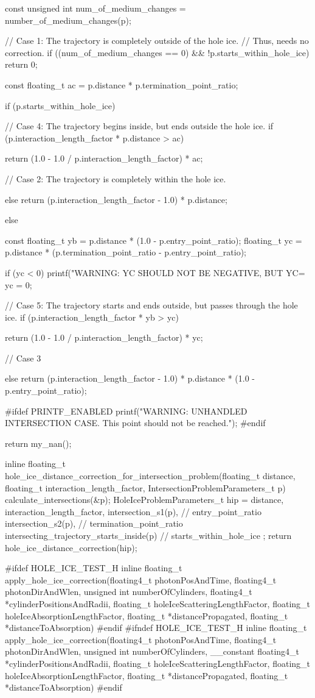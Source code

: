 \begin{ccode}
{  const unsigned int num_of_medium_changes = number_of_medium_changes(p);

  // Case 1: The trajectory is completely outside of the hole ice.
  // Thus, needs no correction.
  if ((num_of_medium_changes == 0) && !p.starts_within_hole_ice) {
    return 0;
  }

  const floating_t ac = p.distance * p.termination_point_ratio;

  if (p.starts_within_hole_ice) {

    // Case 4: The trajectory begins inside, but ends outside the hole ice.
    if (p.interaction_length_factor * p.distance > ac) {
      return (1.0 - 1.0 / p.interaction_length_factor) * ac;

    // Case 2: The trajectory is completely within the hole ice.
    } else {
      return (p.interaction_length_factor - 1.0) * p.distance;
    }

  } else {

    const floating_t yb = p.distance * (1.0 - p.entry_point_ratio);
    floating_t yc = p.distance * (p.termination_point_ratio - p.entry_point_ratio);

    if (yc < 0) {
      printf("WARNING: YC SHOULD NOT BE NEGATIVE, BUT YC=%
      yc = 0;
    }

    // Case 5: The trajectory starts and ends outside, but passes through the hole ice.
    if (p.interaction_length_factor * yb > yc) {
      return (1.0 - 1.0 / p.interaction_length_factor) * yc;

    // Case 3
    } else {
      return (p.interaction_length_factor - 1.0) * p.distance * (1.0 - p.entry_point_ratio);
    }
  }

#ifdef PRINTF_ENABLED
  printf("WARNING: UNHANDLED INTERSECTION CASE. This point should not be reached.");
#endif

  return my_nan();
}

inline floating_t hole_ice_distance_correction_for_intersection_problem(floating_t distance, floating_t interaction_length_factor, IntersectionProblemParameters_t p)
{
  calculate_intersections(&p);
  HoleIceProblemParameters_t hip = {
    distance,
    interaction_length_factor,
    intersection_s1(p), // entry_point_ratio
    intersection_s2(p), // termination_point_ratio
    intersecting_trajectory_starts_inside(p) // starts_within_hole_ice
  };
  return hole_ice_distance_correction(hip);
}

#ifdef HOLE_ICE_TEST_H
inline floating_t apply_hole_ice_correction(floating4_t photonPosAndTime, floating4_t photonDirAndWlen, unsigned int numberOfCylinders, floating4_t *cylinderPositionsAndRadii, floating_t holeIceScatteringLengthFactor, floating_t holeIceAbsorptionLengthFactor, floating_t *distancePropagated, floating_t *distanceToAbsorption)
#endif
#ifndef HOLE_ICE_TEST_H
inline floating_t apply_hole_ice_correction(floating4_t photonPosAndTime, floating4_t photonDirAndWlen, unsigned int numberOfCylinders, __constant floating4_t *cylinderPositionsAndRadii, floating_t holeIceScatteringLengthFactor, floating_t holeIceAbsorptionLengthFactor, floating_t *distancePropagated, floating_t *distanceToAbsorption)
#endif
{

}
\end{ccode}
